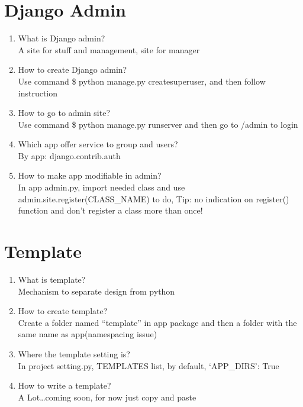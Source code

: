 \documentclass[10pt,a4paper,oneside]{article}
\begin{document}
\section{Django Admin}
\begin{enumerate}[1.]
\item What is Django admin?\\
A site for stuff and management, site for manager
\item How to create Django admin?\\
Use command \$ python manage.py createsuperuser, and then follow instruction
\item How to go to admin site?\\
Use command \$ python manage.py runserver and then go to /admin to login
\item Which app offer service to group and users?\\
By app: django.contrib.auth
\item How to make app modifiable in admin?\\
In app admin.py, import needed class and use admin.site.register(CLASS\_NAME) to do, Tip: no indication on register() function and don’t register a class more than once!
\end{enumerate}
\section{Template}
\begin{enumerate}[1.]
\item What is template?\\
Mechanism to separate design from python
\item How to create template?\\
Create a folder named ``template'' in app package and then a folder with the same name as app(namespacing issue)
\item Where the template setting is?\\
In project setting.py, TEMPLATES list, by default, `APP\_DIRS': True
\item How to write a template?\\
A Lot\dots coming soon, for now just copy and paste
\end{enumerate}
\end{document}
